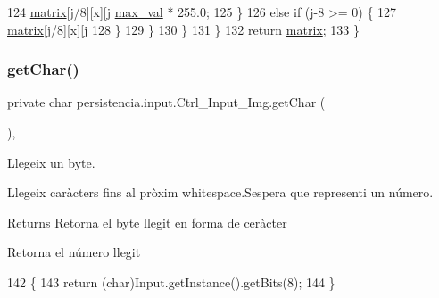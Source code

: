 \begin{DoxyCode}
124                         \hyperlink{classpersistencia_1_1input_1_1Ctrl__Input__Img_ae61f4eb4fa38ea6dfb1e03f443711948}{matrix}[j/8][x][j%
      \hyperlink{classpersistencia_1_1input_1_1Ctrl__Input__Img_a1b8fa2d000a1d5d873be62d1f609e4be}{max\_val} * 255.0;
125                     \}
126                     \textcolor{keywordflow}{else} \textcolor{keywordflow}{if} (j-8 >= 0) \{
127                         \hyperlink{classpersistencia_1_1input_1_1Ctrl__Input__Img_ae61f4eb4fa38ea6dfb1e03f443711948}{matrix}[j/8][x][j%
128                     \}
129                 \}
130             \}
131         \}
132         \textcolor{keywordflow}{return} \hyperlink{classpersistencia_1_1input_1_1Ctrl__Input__Img_ae61f4eb4fa38ea6dfb1e03f443711948}{matrix};
133     \}
\end{DoxyCode}
\mbox{\label{classpersistencia_1_1input_1_1Ctrl__Input__Img_a85a204b05c118b07d403e9b59d7f18c0}} 
\subsubsection{\texorpdfstring{get\+Char()}{getChar()}}
{\footnotesize\ttfamily private char persistencia.\+input.\+Ctrl\+\_\+\+Input\+\_\+\+Img.\+get\+Char (\begin{DoxyParamCaption}{ }\end{DoxyParamCaption})\hspace{0.3cm}{\ttfamily [inline]}, {\ttfamily [private]}}



Llegeix un byte. 

Llegeix caràcters fins al pròxim whitespace.\+S\textquotesingle{}espera que representi un número.

\begin{DoxyReturn}{Returns}
Retorna el byte llegit en forma de ceràcter

Retorna el número llegit 
\end{DoxyReturn}

\begin{DoxyCode}
142                            \{
143         \textcolor{keywordflow}{return} (\textcolor{keywordtype}{char})Input.getInstance().getBits(8);
144     \}
\end{DoxyCode}
\mbox{\label{classpersistencia_1_1input_1_1Ctrl__Input__Img_a55dc2906950235559f83b4765aea73e8}} 
